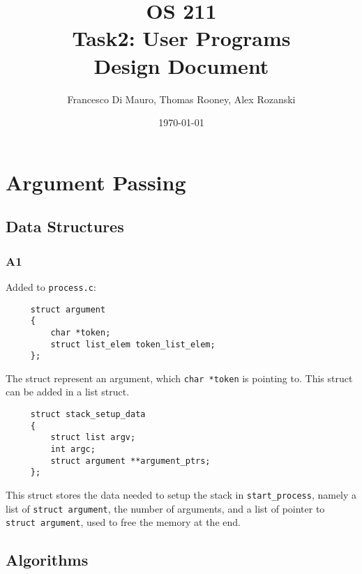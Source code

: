 \documentclass[a4wide, 11pt]{article}
\newcommand{\tab}{\hspace*{2em}}
\newcommand{\tx}{\texttt}
\begin{document}
\title{OS 211 \\ Task2: User Programs \\ Design Document}
\author{Francesco Di Mauro, Thomas Rooney, Alex Rozanski}
\date{\today}
\maketitle

\section{Argument Passing}
\subsection{Data Structures}
\subsubsection{A1}
Added to \tx{process.c}:
\tab \begin{verbatim}
     struct argument
     {
         char *token;
         struct list_elem token_list_elem;
     };
\end{verbatim}
\tab The struct represent an argument, which \tx{char *token} is pointing to. This struct can be added in a list struct.
\\
\tab \begin{verbatim}
     struct stack_setup_data
     {
         struct list argv;
         int argc;
         struct argument **argument_ptrs;
     };
\end{verbatim}
This struct stores the data needed to setup the stack in \tx{start\_process}, namely a list of \tx{struct argument}, the number of arguments, and a list of pointer to \tx{struct argument}, used to free the memory at the end. 

\subsection{Algorithms}
\end{document}
